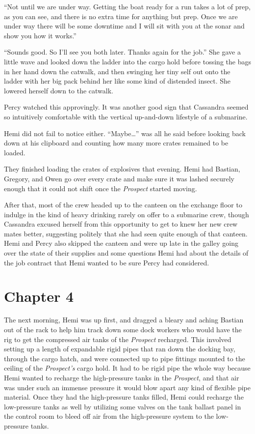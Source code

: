 \documentclass[]{scrbook}
\begin{document}
``Not until we are under way. Getting the boat ready for a run takes a
lot of prep, as you can see, and there is no extra time for anything but
prep. Once we are under way there will be some downtime and I will sit
with you at the sonar and show you how it works.''

``Sounds good. So I'll see you both later. Thanks again for the job.''
She gave a little wave and looked down the ladder into the cargo hold
before tossing the bags in her hand down the catwalk, and then swinging
her tiny self out onto the ladder with her big pack behind her like some
kind of distended insect. She lowered herself down to the catwalk.

Percy watched this approvingly. It was another good sign that Cassandra
seemed so intuitively comfortable with the vertical up-and-down
lifestyle of a submarine.

Hemi did not fail to notice either. ``Maybe\ldots{}'' was all he said
before looking back down at his clipboard and counting how many more
crates remained to be loaded.

They finished loading the crates of explosives that evening. Hemi had
Bastian, Gregory, and Owen go over every crate and make sure it was
lashed securely enough that it could not shift once the \emph{Prospect}
started moving.

After that, most of the crew headed up to the canteen on the exchange
floor to indulge in the kind of heavy drinking rarely on offer to a
submarine crew, though Cassandra excused herself from this opportunity
to get to knew her new crew mates better, suggesting politely that she
had seen quite enough of that canteen. Hemi and Percy also skipped the
canteen and were up late in the galley going over the state of their
supplies and some questions Hemi had about the details of the job
contract that Hemi wanted to be sure Percy had considered.

\hypertarget{chapter-4}{%
\chapter*{Chapter 4}\label{chapter-4}}

The next morning, Hemi was up first, and dragged a bleary and aching
Bastian out of the rack to help him track down some dock workers who
would have the rig to get the compressed air tanks of the
\emph{Prospect} recharged. This involved setting up a length of
expandable rigid pipes that ran down the docking bay, through the cargo
hatch, and were connected up to pipe fittings mounted to the ceiling of
the \emph{Prospect's} cargo hold. It had to be rigid pipe the whole way
because Hemi wanted to recharge the high-pressure tanks in the
\emph{Prospect}, and that air was under such an immense pressure it
would blow apart any kind of flexible pipe material. Once they had the
high-pressure tanks filled, Hemi could recharge the low-pressure tanks
as well by utilizing some valves on the tank ballast panel in the
control room to bleed off air from the high-pressure system to the
low-pressure tanks.
\end{document}
